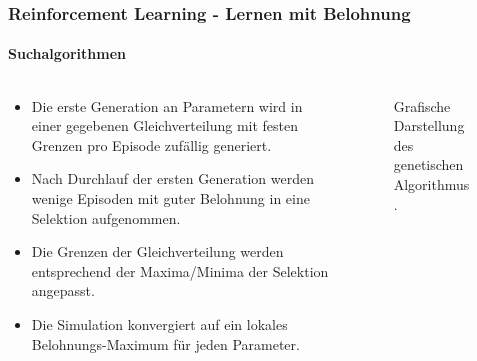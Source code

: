\documentclass[10pt,t,aspectratio=1610]{beamer}
\newcommand{\ChapterRl}{Reinforcement Learning - Lernen mit Belohnung}
\begin{document}
\begin{frame}
\frametitle{\ChapterRl}
\framesubtitle{Suchalgorithmen}
\vspace{0.3cm}
\begin{columns}[T,onlytextwidth]
	\begin{column}{0.5\textwidth}
		\vspace{0.1cm}
		\begin{itemize}
			\item Die erste Generation an Parametern wird in einer gegebenen Gleichverteilung mit festen Grenzen pro Episode zufällig generiert.
			\item Nach Durchlauf der ersten Generation werden wenige Episoden mit guter Belohnung in eine Selektion aufgenommen.
			\item Die Grenzen der Gleichverteilung werden entsprechend der Maxima/Minima der Selektion angepasst.
			\item Die Simulation konvergiert auf ein lokales Belohnungs-Maximum für jeden Parameter.
		\end{itemize}
	\end{column}
	\begin{column}{0.45\textwidth}
		\begin{figure}[H] %
			\centering
			\scriptsize
			\def\svgwidth{6.3cm}
			
			\caption{Grafische Darstellung des genetischen Algorithmus.}
			\label{fig:gen_alg}
		\end{figure}
	\end{column}
\end{columns}
\end{frame}

\end{document}
